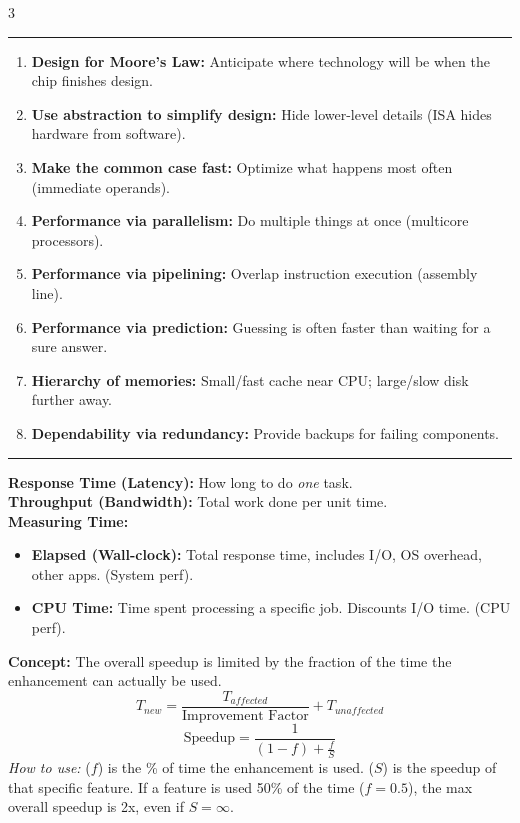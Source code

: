 \documentclass[6pt, letterpaper]{article}
\newcommand{\sectionhead}[1]{%
    \vspace{1mm}{\large\bfseries#1}\vspace{0.2mm}\hrule\vspace{0.8mm}%
}
\begin{document}
\begin{multicols}{3}

\sectionhead{The 8 Great Ideas in Architecture}
\begin{enumerate}
    \item \textbf{Design for Moore’s Law:} Anticipate where technology will be when the chip finishes design.
    \item \textbf{Use abstraction to simplify design:} Hide lower-level details (ISA hides hardware from software).
    \item \textbf{Make the common case fast:} Optimize what happens most often (immediate operands).
    \item \textbf{Performance via parallelism:} Do multiple things at once (multicore processors).
    \item \textbf{Performance via pipelining:} Overlap instruction execution (assembly line).
    \item \textbf{Performance via prediction:} Guessing is often faster than waiting for a sure answer.
    \item \textbf{Hierarchy of memories:} Small/fast cache near CPU; large/slow disk further away.
    \item \textbf{Dependability via redundancy:} Provide backups for failing components.
\end{enumerate}

\sectionhead{Defining Performance}
\textbf{Response Time (Latency):} How long to do \textit{one} task. \\
\textbf{Throughput (Bandwidth):} Total work done per unit time. \\
\textbf{Measuring Time:}
\begin{itemize}
    \item \textbf{Elapsed (Wall-clock):} Total response time, includes I/O, OS overhead, other apps. (System perf).
    \item \textbf{CPU Time:} Time spent processing a specific job. Discounts I/O time. (CPU perf).
\end{itemize}

\begin{tcolorbox}[colback=green!5, colframe=black, boxrule=0.5pt, title=\textbf{Amdahl's Law}]
\textbf{Concept:} The overall speedup is limited by the fraction of the time the enhancement can actually be used.
\[ T_{new} = \frac{T_{affected}}{\text{Improvement Factor}} + T_{unaffected} \]
\[ \text{Speedup} = \frac{1}{(1 - f) + \frac{f}{S}} \]
\textit{How to use:} ($f$) is the \% of time the enhancement is used. ($S$) is the speedup of that specific feature. If a feature is used 50\% of the time ($f=0.5$), the max overall speedup is 2x, even if $S = \infty$.
\end{tcolorbox}




\end{multicols}
\end{document}
